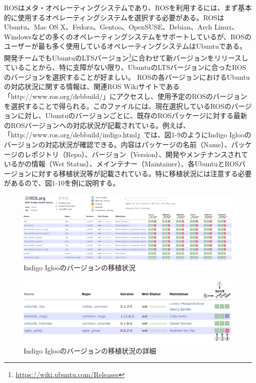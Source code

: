 ROSはメタ・オペレーティングシステムであり、ROSを利用するには、まず基本的に使用するオペレーティングシステムを選択する必要がある。ROSはUbuntu、Mac OS X、Fedora、Gentoo、OpenSUSE、Debian、Arch Linux、Windowsなどの多くのオペレーティングシステムをサポートしているが、ROSのユーザーが最も多く使用しているオペレーティングシステムはUbuntuである。開発チームでもUbuntuのLTSバージョン\footnote{\url{https://wiki.ubuntu.com/Releases}}に合わせて新バージョンをリリースしていることから、特に支障がない限り、UbuntuのLTSバージョンに合ったROSのバージョンを選択することが好ましい。
ROSの各バージョンにおけるUbuntuの対応状況に関する情報は、関連ROS Wikiサイトである「http://www.ros.org/debbuild/」にアクセスし、使用予定のROSのバージョンを選択することで得られる。このファイルには、現在選択しているROSのバージョンに対し、Ubuntuのバージョンごとに、既存のROSパッケージに対する最新のROSバージョンへの対応状況が記載されている。例えば、「http://www.ros.org/debbuild/indigo.html」では、図1-9のようにIndigo Iglooのバージョンの対応状況が確認できる。内容はパッケージの名前（Name）、パッケージのレポジトリ（Repo）、バージョン（Version）、開発やメンテナンスされているかの情報（Wet Status）、メインテナー（Maintainer）、各UbuntuとROSバージョンに対する移植状況等が記載されている。特に移植状況には注意する必要があるので、図1-10を例に説明する。

\begin{figure}[h]
  \centering
  \includegraphics[width=\columnwidth]{pictures/chapter1/pic_01_09.png}
  \caption{Indigo Iglooのバージョンの移植状況}
\end{figure}

\begin{figure}[h]
  \centering
  \includegraphics[width=\columnwidth]{pictures/chapter1/pic_01_10.png}
  \caption{Indigo Iglooのバージョンの移植状況の詳細}
\end{figure}


